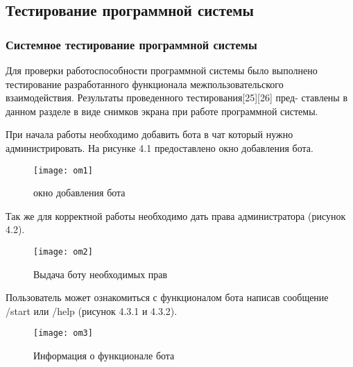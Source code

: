 \subsection {Тестирование программной системы}
\subsubsection{Системное тестирование программной системы}
Для проверки работоспособности программной системы было выполнено тестирование разработанного функционала межпользовательского взаимодействия. Результаты проведенного тестирования[25][26] пред- ставлены в данном разделе в виде снимков экрана при работе программной системы.

При начала работы необходимо добавить бота в чат который нужно администрировать. На рисунке 4.1 предоставлено окно добавления бота.


	
\begin{figure}
	\centering
	\texttt{[image: om1]}
	\caption{окно добавления бота }
	\label{om1:image}
\end{figure}
	
Так же для корректной работы необходимо дать права администратора (рисунок 4.2). 
\begin{figure}
	\centering
	\texttt{[image: om2]}
	\caption{Выдача боту необходимых прав}
	\label{om2:image}
\end{figure}

Пользователь может ознакомиться с функционалом бота написав сообщение /start или /help (рисунок 4.3.1 и 4.3.2).

\begin{figure}
	\centering
	\texttt{[image: om3]}
	\caption{Информация о функционале бота}
	\label{om3:image}
\end{figure}

